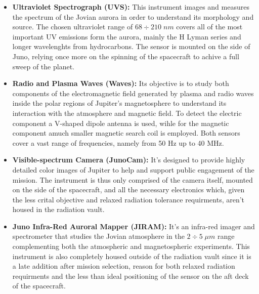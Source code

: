 \begin{itemize}
    \item \textbf{Ultraviolet Spectrograph (UVS):} This instrument images and measures the spectrum of the Jovian aurora in order to understand its morphology and source. The chosen ultraviolet range of $68 \div 210 \;nm$ covers all of the most important UV emissions form the aurora, mainly the H Lyman series and longer wavelenghts from hydrocarbons. The sensor is mounted on the side of Juno, relying once more on the spinning of the spacecraft to achive a full sweep of the planet. 
    
    \item \textbf{Radio and Plasma Waves (Waves):} Its objective is to study both components of the electromagnetic field generated by plasma and radio waves inside the polar regions of Jupiter's magnetosphere to understand its interaction with the atmosphere and magnetic field. To detect the electric component a V-shaped dipole antenna is used, wihle for the magnetic component amuch smaller magnetic search coil is employed. Both sensors cover a vast range of frequencies, namely from 50 Hz up to 40 MHz.

    \item \textbf{Visible-spectrum Camera (JunoCam):} It's designed to provide highly detailed color images of Jupiter to help and support public engagement of the mission. The instrument is thus only comprised of the camera itself, mounted on the side of the spacecraft, and all the necessary electronics which, given the less crital objective and relaxed radiation tolerance requirments, aren't housed in the radiation vault.

    \item \textbf{Juno Infra-Red Auroral Mapper (JIRAM):} It's an infra-red imager and spectrometer that studies the Jovian atmosphere in the \(2 \div 5 \;\mu m\) range complementing both the atmospheric and magnetospheric experiments. This instrument is also completely housed outside of the radiation vault since it is a late addition after mission selection, reason for both relaxed radiation requirments and the less than ideal positioning of the sensor on the aft deck of the spacecraft.
       
\end{itemize}


